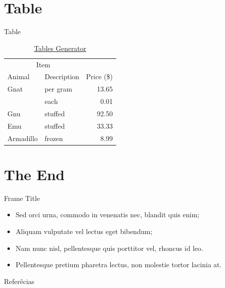 \documentclass[10pt,fleqn]{beamer}
\begin{document}
\section{Table} \label{sec:table}
\begin{frame}{Table}
    \begin{table}[]
    \centering
        \begin{tabular}{llr}
            \hline
            \multicolumn{2}{c}{Item} &            \\ \cline{1-2}
            Animal     & Description & Price (\$) \\ \hline
            Gnat       & per gram    & 13.65      \\
                       & each        & 0.01       \\
            Gnu        & stuffed     & 92.50      \\
            Emu        & stuffed     & 33.33      \\
            Armadillo  & frozen      & 8.99       \\ \hline
        \end{tabular}
        \caption{\href{https://www.tablesgenerator.com/}{Tables Generator}}
        \label{table:table-generator}
\end{table}
\end{frame}

\section{The End} \label{sec:the-end}
\begin{frame}{Frame Title}
    \begin{itemize}
        \item Sed orci urna, commodo in venenatis nec, blandit quis enim;
    
        \item Aliquam vulputate vel lectus eget bibendum;
    
        \item Nam nunc nisl, pellentesque quis porttitor vel, rhoncus id leo.
        
        \item Pellentesque pretium pharetra lectus, non molestie tortor lacinia at.
    \end{itemize}
\end{frame}

\begin{frame}[allowframebreaks]{Referêcias}

\end{frame}
\end{document}
